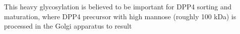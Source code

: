 This heavy glycosylation is believed to be important for DPP4 sorting and maturation, where DPP4 precursor with high mannose (roughly 100 kDa) is processed in the Golgi apparatus to result  \cite{Matter_1991}